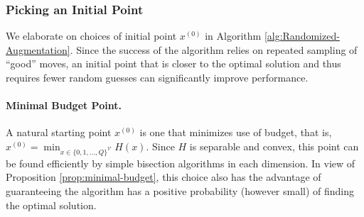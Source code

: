 \documentclass[pdflatex,sn-mathphys-num]{sn-jnl}%
\DeclareMathOperator{\Vcal}{\mathcal{V}}
\begin{document}
\subsubsection{Picking an Initial Point}\label{sec:starting-point}
We elaborate on choices of initial point $x^{(0)}$ in Algorithm \ref{alg:Randomized-Augmentation}. Since the success of the algorithm relies on repeated sampling of ``good'' moves, an initial point that is closer to the optimal solution and thus requires fewer random guesses can significantly improve performance. 


\paragraph{Minimal Budget Point.}
A natural starting point $x^{(0)}$ is one that minimizes use of budget, that is, $x^{(0)} = \min_{x \in \{0,1,\ldots,Q\}^{\Vcal}} H(x)$. Since $H$ is separable and convex, this point can be found efficiently by simple bisection algorithms in each dimension. In view of Proposition \ref{prop:minimal-budget}, this choice also has the advantage of guaranteeing the algorithm has a positive probability (however small) of finding the optimal solution.
\end{document}
